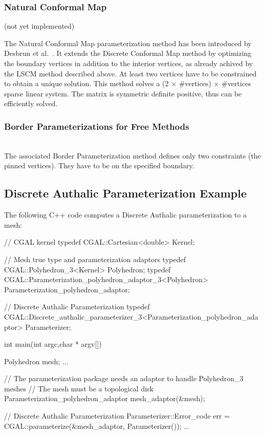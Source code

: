 \subsubsection{Natural Conformal Map}

(not yet implemented)

The Natural Conformal Map parameterization method has been introduced
by Desbrun et al.~\cite{cgal:dma-ipsm-02}. It extends the Discrete
Conformal Map method by optimizing the boundary vertices in addition
to the interior vertices, as already achived by the LSCM method
described above. At least two vertices have to be constrained to
obtain a unique solution. This method solves a (2 $\times$ \#vertices) $\times$
\#vertices sparse linear system.  The matrix is symmetric definite
positive, thus can be efficiently solved.



\subsubsection{Border Parameterizations for Free Methods}

  \\

The associated Border Parameterization method defines only two constraints
(the pinned vertices). They have to be on the specified boundary.


\subsection{Discrete Authalic Parameterization Example}

The following C++ code computes a Discrete Authalic parameterization
to a  mesh:

\begin{ccExampleCode}

// CGAL kernel
typedef CGAL::Cartesian<double>                         Kernel;

// Mesh true type and parameterization adaptors
typedef CGAL::Polyhedron_3<Kernel>                      Polyhedron;
typedef CGAL::Parameterization_polyhedron_adaptor_3<Polyhedron>
                                                        Parameterization_polyhedron_adaptor;

// Discrete Authalic Parameterization
typedef CGAL::Discrete_authalic_parameterizer_3<Parameterization_polyhedron_adaptor>
                                                        Parameterizer;

int main(int argc,char * argv[])
{
    Polyhedron mesh;
    ...

    // The parameterization package needs an adaptor to handle Polyhedron_3 meshes
    // The mesh must be a topological disk
    Parameterization_polyhedron_adaptor mesh_adaptor(&mesh);

    // Discrete Authalic Parameterization
    Parameterizer::Error_code err = CGAL::parameterize(&mesh_adaptor, Parameterizer());
    ...
}

\end{ccExampleCode}

